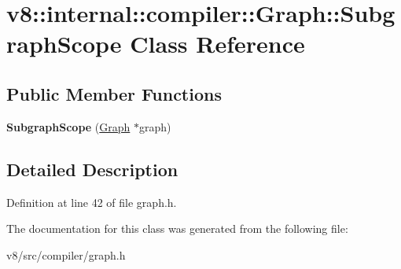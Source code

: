 \hypertarget{classv8_1_1internal_1_1compiler_1_1Graph_1_1SubgraphScope}{}\section{v8\+:\+:internal\+:\+:compiler\+:\+:Graph\+:\+:Subgraph\+Scope Class Reference}
\label{classv8_1_1internal_1_1compiler_1_1Graph_1_1SubgraphScope}
\subsection*{Public Member Functions}
\begin{DoxyCompactItemize}
\item 
\mbox{\label{classv8_1_1internal_1_1compiler_1_1Graph_1_1SubgraphScope_afbd0be1b57f6837d425b1819646e5dc0}} 
{\bfseries Subgraph\+Scope} (\mbox{\hyperlink{classv8_1_1internal_1_1compiler_1_1Graph}{Graph}} $\ast$graph)
\end{DoxyCompactItemize}


\subsection{Detailed Description}


Definition at line 42 of file graph.\+h.



The documentation for this class was generated from the following file\+:\begin{DoxyCompactItemize}
\item 
v8/src/compiler/graph.\+h\end{DoxyCompactItemize}
